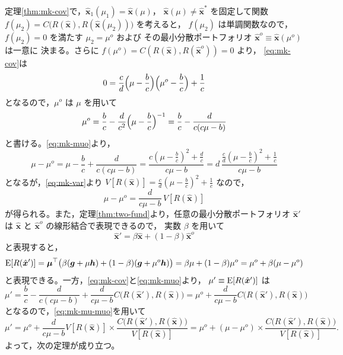 定理\ref{thm:mk-cov}で，$\hat{\bm{x}}_1(\mu_1) = \hat{\bm{x}}(\mu)$，
$\hat{\bm{x}}(\mu) \neq \hat{\bm{x}}^*$ を固定して関数
$f(\mu_2) = C\bigl(R(\hat{\bm{x}}), R(\hat{\bm{x}}(\mu_2))\bigr)$ を考えると，
$f(\mu_2)$ は単調関数なので，$f(\mu_2) = 0$ を満たす $\mu_2 = \mu^o$ および
その最小分散ポートフォリオ $\hat{\bm{x}}^o \equiv \hat{\bm{x}}(\mu^o)$ は一意に
決まる。さらに $f(\mu^o) = C(R(\hat{\bm{x}}), R(\hat{\bm{x}}^o)) = 0$ より，
\eqref{eq:mk-cov}は
\begin{equation}
0 = \frac{c}{d}\Bigl(\mu-\frac{b}{c}\Bigr)\Bigl(\mu^o-\frac{b}{c}\Bigr)
+ \frac{1}{c}
\end{equation}
となるので，$\mu^o$ は $\mu$ を用いて
\begin{equation}
\mu^o = \frac{b}{c} - \frac{d}{c^2}\Bigl(\mu - \frac{b}{c}\Bigr)^{-1}
= \frac{b}{c} - \frac{d}{c(c\mu - b)}
\label{eq:mk-muo}
\end{equation}
と書ける。\eqref{eq:mk-muo}より，
\begin{equation}
\mu - \mu^o = \mu - \frac{b}{c} + \frac{d}{c(c\mu-b)}
= \frac{c(\mu-\frac{b}{c})^2 + \frac{d}{c}}{c\mu - b}
= d\,\frac{\frac{c}{d}(\mu-\frac{b}{c})^2 + \frac{1}{c}}{c\mu - b}
\end{equation}
となるが，\eqref{eq:mk-var}より
$V[R(\hat{\bm{x}})] = \frac{c}{d}(\mu-\frac{b}{c})^2 + \frac{1}{c}$ なので，
\begin{equation}
\mu - \mu^o = \frac{d}{c\mu - b}\,V[R(\hat{\bm{x}})]
\label{eq:mk-mu-muo}
\end{equation}
が得られる。また，定理\ref{thm:two-fund}より，任意の最小分散ポートフォリオ
$\hat{\bm{x}}'$ は $\hat{\bm{x}}$ と $\hat{\bm{x}}^o$ の線形結合で表現できるので，
実数 $\beta$ を用いて
\begin{equation}
\hat{\bm{x}}' = \beta\hat{\bm{x}} + (1-\beta)\hat{\bm{x}}^o
\end{equation}
と表現すると，
\begin{equation}
\mathrm{E}[R(\hat{\bm{x}}')]
= \bm{\mu}^\top\bigl(\beta(\bm{g}+\mu\bm{h}) + (1-\beta)(\bm{g}+\mu^o\bm{h})\bigr)
= \beta\mu + (1-\beta)\mu^o = \mu^o + \beta(\mu - \mu^o)
\end{equation}
と表現できる。一方，\eqref{eq:mk-cov}と\eqref{eq:mk-muo}より，
$\mu' \equiv \mathrm{E}[R(\hat{\bm{x}}')]$ は
\begin{equation}
\mu' = \frac{b}{c} - \frac{d}{c(c\mu-b)} + \frac{d}{c\mu-b}
C\bigl(R(\hat{\bm{x}}'),R(\hat{\bm{x}})\bigr)
= \mu^o + \frac{d}{c\mu-b}C\bigl(R(\hat{\bm{x}}'),R(\hat{\bm{x}})\bigr)
\end{equation}
となるので，\eqref{eq:mk-mu-muo}を用いて
\begin{equation}
\mu' = \mu^o + \frac{d}{c\mu-b}V[R(\hat{\bm{x}})]\times
\frac{C\bigl(R(\hat{\bm{x}}'),R(\hat{\bm{x}})\bigr)}{V[R(\hat{\bm{x}})]}
= \mu^o + (\mu-\mu^o)\times
\frac{C\bigl(R(\hat{\bm{x}}'),R(\hat{\bm{x}})\bigr)}{V[R(\hat{\bm{x}})]}.
\end{equation}
よって，次の定理が成り立つ。

